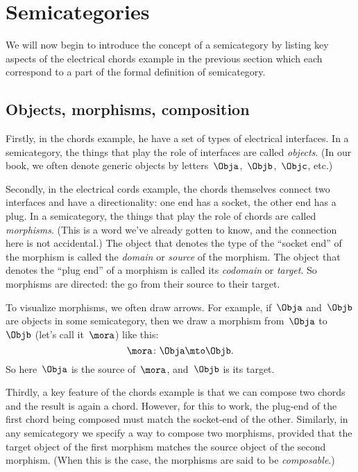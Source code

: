 
\section[Semicategories]{Semicategories}
\label{sec:formal-def-semicat}


We will now begin to introduce the concept of a semicategory by listing key aspects of the electrical chords example in the previous section which each correspond to a part of the formal definition of semicategory.

\subsection{Objects, morphisms, composition}

Firstly, in the chords example, he have a set of types of electrical interfaces.
In a semicategory, the things that play the role of interfaces are called \emph{objects}.
(In our book, we often denote generic objects by letters~$\Obja$,~$\Objb$,~$\Objc$, etc.)

Secondly, in the electrical cords example, the chords themselves connect two interfaces and have a directionality: one end has a socket, the other end has a plug.
In a semicategory, the things that play the role of chords are called \emph{morphisms}.
(This is a word we've already gotten to know, and the connection here is not accidental.) The object that denotes the type of the ``socket end'' of the morphism is called the \emph{domain} or \emph{source} of the morphism.
The object that denotes the ``plug end'' of a morphism is called its \emph{codomain} or \emph{target}.
So morphisms are directed: the go from their source to their target.

To visualize morphisms, we often draw arrows.
For example, if~$\Obja$ and~$\Objb$ are objects in some semicategory, then we draw a morphism from~$\Obja$ to~$\Objb$ (let's call it~$\mora$) like this:
\begin{equation*}
    \mora\colon \Obja \mto \Objb.
\end{equation*}
So here~$\Obja$ is the source of~$\mora$, and~$\Objb$ is its target.

Thirdly, a key feature of the chords example is that we can compose two chords and the result is again a chord.
However, for this to work, the plug-end of the first chord being composed must match the socket-end of the other.
Similarly, in any semicategory we specify a way to compose two morphisms, provided that the target object of the first morphism matches the source object of the second morphism.
(When this is the case, the morphisms are said to be \emph{composable}.)

